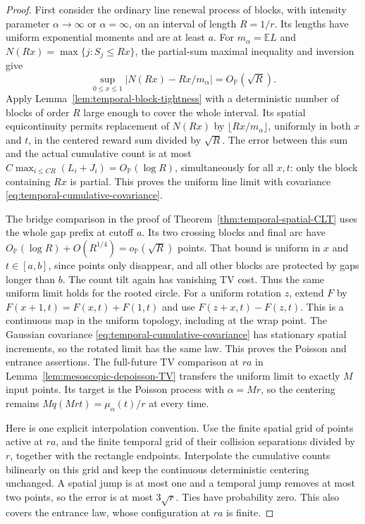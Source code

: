 \documentclass[11pt,letterpaper]{article}
\newcommand{\PP}{\mathbb P}\newcommand{\EE}{\mathbb E}
\begin{document}
\begin{proof}
First consider the ordinary line renewal process of blocks,
with intensity parameter $\alpha\to\infty$ or $\alpha=\infty$,
on an interval of length $R=1/r$. Its lengths have uniform
exponential moments and are at least $a$. For
$m_\alpha=\EE L$ and $N(Rx)=\max\{j:S_j\le Rx\}$, the
partial-sum maximal inequality and inversion give
\[
 \sup_{0\le x\le1}|N(Rx)-Rx/m_\alpha|=O_{\PP}(\sqrt R).
\]
Apply Lemma~\ref{lem:temporal-block-tightness} with a deterministic
number of blocks of order $R$ large enough to cover the whole
interval. Its spatial equicontinuity permits replacement of
$N(Rx)$ by $\lfloor Rx/m_\alpha\rfloor$, uniformly in both
$x$ and $t$, in the centered reward sum divided by $\sqrt R$.
The error between this sum and the actual cumulative count is
at most $C\max_{i\le CR}(L_i+J_i)=O_{\PP}(\log R)$,
simultaneously for all $x,t$: only the block containing $Rx$
is partial. This proves the uniform line limit with covariance
\eqref{eq:temporal-cumulative-covariance}.

The bridge comparison in the proof of
Theorem~\ref{thm:temporal-spatial-CLT} uses the whole gap prefix
at cutoff $a$. Its two crossing blocks and final arc have
$O_{\PP}(\log R)+O(R^{1/4})=o_{\PP}(\sqrt R)$ points.
That bound is uniform in $x$ and $t\in[a,b]$, since points only
disappear, and all other blocks are protected by gaps longer
than $b$. The count tilt again has vanishing TV cost. Thus the
same uniform limit holds for the rooted circle.
For a uniform rotation $z$, extend $F$ by
$F(x+1,t)=F(x,t)+F(1,t)$ and use
$F(z+x,t)-F(z,t)$. This is a continuous map in the uniform
topology, including at the wrap point. The Gaussian covariance
\eqref{eq:temporal-cumulative-covariance} has stationary
spatial increments, so the rotated limit has the same law.
This proves the Poisson and entrance assertions.
The full-future TV comparison at $ra$ in
Lemma~\ref{lem:mesoscopic-depoisson-TV} transfers the uniform
limit to exactly $M$ input points. Its target is the Poisson
process with $\alpha=Mr$, so the centering remains
$Mq(Mrt)=\mu_\alpha(t)/r$ at every time.

Here is one explicit interpolation convention. Use the finite
spatial grid of points active at $ra$, and the finite temporal
grid of their collision separations divided by $r$, together
with the rectangle endpoints. Interpolate the cumulative counts
bilinearly on this grid and keep the continuous deterministic
centering unchanged. A spatial jump is at most one and a
temporal jump removes at most two points, so the error is at
most $3\sqrt r$. Ties have probability zero. This also covers
the entrance law, whose configuration at $ra$ is finite.


\end{proof}
\end{document}
